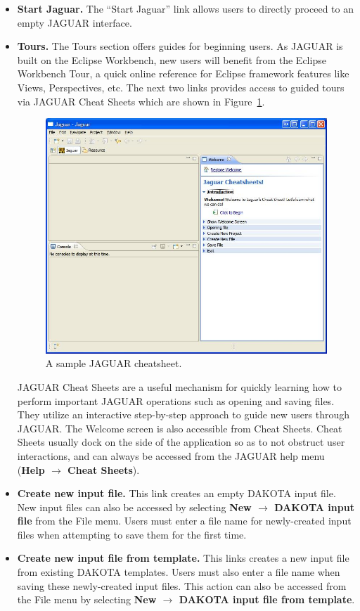 \begin{itemize}
\item {\bf Start Jaguar.}  The ``Start Jaguar'' link allows users to
  directly proceed to an empty JAGUAR interface.  

\item {\bf Tours.} The Tours section offers guides for beginning
users.  As JAGUAR is built on the Eclipse Workbench, new users will
benefit from the Eclipse Workbench Tour, a quick online reference for
Eclipse framework features like Views, Perspectives, etc.  The next
two links provides access to guided tours via JAGUAR Cheat Sheets
which are shown in Figure~\ref{fig:input:jag_cheatsheets}.
\begin{figure}
  \centering
  \includegraphics[scale=0.6]{images/jag_cheatsheets}
  \caption{A sample JAGUAR cheatsheet.}
  \label{fig:input:jag_cheatsheets}
\end{figure}
JAGUAR Cheat Sheets are a useful mechanism for quickly learning how to
perform important JAGUAR operations such as opening and saving files.
They utilize an interactive step-by-step approach to guide new users
through JAGUAR.  The Welcome screen is also accessible from Cheat
Sheets.  Cheat Sheets usually dock on the side of the application so
as to not obstruct user interactions, and can always be accessed from
the JAGUAR help menu ({\bf Help $\rightarrow$ Cheat Sheets}).

\item {\bf Create new input file.}  This link creates an empty DAKOTA
  input file.  New input files can also be accessed by selecting {\bf
    New $\rightarrow$ DAKOTA input file} from the File menu.  Users
  must enter a file name for newly-created input files when attempting
  to save them for the first time.

\item {\bf Create new input file from template.}  This links creates a
  new input file from existing DAKOTA templates.  Users must also
  enter a file name when saving these newly-created input files.  This
  action can also be accessed from the File menu by selecting {\bf New
  $\rightarrow$ DAKOTA input file from template}.

\end{itemize}

